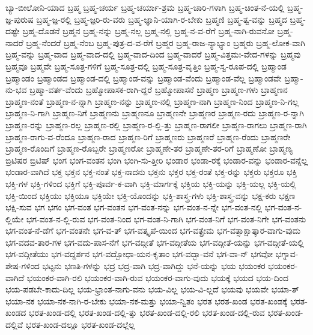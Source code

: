 {ಬ್ಯಾ-ಬೀಲೋನಿ-ಯಾದ
ಬ್ರಹ್ಮ
ಬ್ರಹ್ಮ-ಚರ್ಯ
ಬ್ರಹ್ಮ-ಚರ್ಯಾ-ಶ್ರಮ
ಬ್ರಹ್ಮ-ಚಾರಿ-ಗಳಾಗಿ
ಬ್ರಹ್ಮ-ಚಿಂತ-ನೆ-ಯಲ್ಲಿ
ಬ್ರಹ್ಮ-ಜ್ಞ-ಪುರುಷ
ಬ್ರಹ್ಮ-ಜ್ಞ-ರಲ್ಲಿ
ಬ್ರಹ್ಮ-ಜ್ಞರಿ-ರು-ವರು
ಬ್ರಹ್ಮ-ಜ್ಞಾನಿ-ಯಾಗಿ-ರ-ಬೇಕು
ಬ್ರಹ್ಮಣಿ
ಬ್ರಹ್ಮ-ತ್ವ-ವನ್ನು
ಬ್ರಹ್ಮದ
ಬ್ರಹ್ಮ-ದಷ್ಟೇ
ಬ್ರಹ್ಮ-ದೊಡನೆ
ಬ್ರಹ್ಮನ
ಬ್ರಹ್ಮ-ನನ್ನು
ಬ್ರಹ್ಮ-ನಲ್ಲ
ಬ್ರಹ್ಮ-ನಲ್ಲಿ
ಬ್ರಹ್ಮ-ನ-ವ-ರೆಗೆ
ಬ್ರಹ್ಮ-ನಾಗಿ-ರುವನೋ
ಬ್ರಹ್ಮ-ನಾದರೆ
ಬ್ರಹ್ಮ-ನೆಂದರೆ
ಬ್ರಹ್ಮ-ನೆಂಬ
ಬ್ರಹ್ಮ-ಪುತ್ರ-ದ-ವ-ರೆಗೆ
ಬ್ರಹ್ಮರ
ಬ್ರಹ್ಮ-ರಾಜ-ನ್ಯಾಭ್ಯಾಂ
ಬ್ರಹ್ಮರು
ಬ್ರಹ್ಮ-ಲೋಕ-ವಾಗಿ
ಬ್ರಹ್ಮ-ವನ್ನು
ಬ್ರಹ್ಮ-ವಾದ
ಬ್ರಹ್ಮ-ವಾದ-ದಲ್ಲಿ
ಬ್ರಹ್ಮ-ವಾದ-ದಿಂದ
ಬ್ರಹ್ಮ-ವಾದರೆ
ಬ್ರಹ್ಮ-ವಿತ್ತಮಃ-ವೇದ-ಗಳನ್ನು
ಬ್ರಹ್ಮವು
ಬ್ರಹ್ಮವೂ
ಬ್ರಹ್ಮವೇ
ಬ್ರಹ್ಮ-ಸೂತ್ರ-ಗಳಿಗೆ
ಬ್ರಹ್ಮ-ಸೂತ್ರ-ದಲ್ಲಿ
ಬ್ರಹ್ಮ-ಸೂತ್ರ-ವೃತ್ತಿಂ
ಬ್ರಹ್ಮ-ಸ್ವ-ರೂಪ-ದಲ್ಲಿ
ಬ್ರಹ್ಮಾಂಡ
ಬ್ರಹ್ಮಾಂಡಂ
ಬ್ರಹ್ಮಾಂಡದ
ಬ್ರಹ್ಮಾಂಡ-ದಲ್ಲಿ
ಬ್ರಹ್ಮಾಂಡ-ವನ್ನು
ಬ್ರಹ್ಮಾಂಡ-ವೆಂದು
ಬ್ರಹ್ಮಾಂಡ-ವೆಲ್ಲ
ಬ್ರಹ್ಮಾಂಡವೇ
ಬ್ರಹ್ಮಾ-ನು-ಭವ
ಬ್ರಹ್ಮಾ-ವರ್ತ-ವೆಂದು
ಬ್ರಹ್ಮೋಪಾಸಕ-ರಾಗಿ-ದ್ದರೆ
ಬ್ರಹ್ಮೋಪಾಸನೆ
ಬ್ರಾಹ್ಮಣ
ಬ್ರಾಹ್ಮಣ-ಗಳು
ಬ್ರಾಹ್ಮಣನ
ಬ್ರಾಹ್ಮಣ-ನಂತೆ
ಬ್ರಾಹ್ಮಣ-ನ-ನ್ನಾಗಿ
ಬ್ರಾಹ್ಮಣ-ನನ್ನು
ಬ್ರಾಹ್ಮಣ-ನಲ್ಲಿ
ಬ್ರಾಹ್ಮಣ-ನಾಗಿ
ಬ್ರಾಹ್ಮಣ-ನಿಂದ
ಬ್ರಾಹ್ಮಣ-ನಿ-ಗಲ್ಲ
ಬ್ರಾಹ್ಮಣ-ನಿ-ಗಾಗಿ
ಬ್ರಾಹ್ಮಣ-ನಿಗೆ
ಬ್ರಾಹ್ಮಣನು
ಬ್ರಾಹ್ಮಣನೂ
ಬ್ರಾಹ್ಮಣನೇ
ಬ್ರಾಹ್ಮಣರ
ಬ್ರಾಹ್ಮಣ-ರದು
ಬ್ರಾಹ್ಮಣ-ರ-ನ್ನಾಗಿ
ಬ್ರಾಹ್ಮಣ-ರನ್ನು
ಬ್ರಾಹ್ಮಣ-ರಲ್ಲ
ಬ್ರಾಹ್ಮಣ-ರಲ್ಲಿ
ಬ್ರಾಹ್ಮಣ-ರ-ಲ್ಲಿ-ತ್ತು
ಬ್ರಾಹ್ಮಣ-ರಾಗಲೀ
ಬ್ರಾಹ್ಮಣ-ರಾಗಲು
ಬ್ರಾಹ್ಮಣ-ರಾಗಿ
ಬ್ರಾಹ್ಮಣ-ರಾಗು-ವ-ರೆಂದೂ
ಬ್ರಾಹ್ಮಣ-ರಾದ
ಬ್ರಾಹ್ಮಣ-ರಿಗೆ
ಬ್ರಾಹ್ಮಣರು
ಬ್ರಾಹ್ಮಣರೆ
ಬ್ರಾಹ್ಮಣ-ರೆಂದು
ಬ್ರಾಹ್ಮಣರೇ
ಬ್ರಾಹ್ಮಣ-ರೊಂದಿಗೆ
ಬ್ರಾಹ್ಮಣ-ರೊಬ್ಬರೇ
ಬ್ರಾಹ್ಮಣರೋ
ಬ್ರಾಹ್ಮಣೇ-ತರ
ಬ್ರಾಹ್ಮಣೇ-ತರ-ರಿಗೆ
ಬ್ರಾಹ್ಮಣೋ
ಬ್ರಾಹ್ಮಣ್ಯ
ಬ್ರಿಟಿಷರ
ಬ್ರಿಟಿಷ್
ಭಂಗ
ಭಂಗ-ವಂತನ
ಭಂಗಿ
ಭಂಗಿ-ಸು-ತ್ತೀರಿ
ಭಂಡಾರ
ಭಂಡಾ-ರಕ್ಕೆ
ಭಂಡಾರ-ವನ್ನು
ಭಂಡಾರ-ವನ್ನೆಲ್ಲ
ಭಂಡಾರ-ವಾಗಿದೆ
ಭಕ್ತ
ಭಕ್ತನ
ಭಕ್ತ-ನಂತೆ
ಭಕ್ತ-ನಾದನು
ಭಕ್ತನು
ಭಕ್ತರ
ಭಕ್ತ-ರಂತೆ
ಭಕ್ತ-ರನ್ನು
ಭಕ್ತರು
ಭಕ್ತರೂ
ಭಕ್ತಿ
ಭಕ್ತಿ-ಗಳ
ಭಕ್ತಿ-ಗಳಿಂದ
ಭಕ್ತಿಗೆ
ಭಕ್ತಿ-ಪೂರ್ವ-ಕ-ವಾಗಿ
ಭಕ್ತಿ-ಮಾರ್ಗಕ್ಕೆ
ಭಕ್ತಿಯ
ಭಕ್ತಿ-ಯನ್ನು
ಭಕ್ತಿ-ಯಲ್ಲ
ಭಕ್ತಿ-ಯಲ್ಲಿ
ಭಕ್ತಿ-ಯಿಂದ
ಭಕ್ತಿಯು
ಭಕ್ತಿಯೂ
ಭಕ್ತಿಯೇ
ಭಕ್ತಿ-ಯೊಂದನ್ನು
ಭಕ್ತಿ-ಶಾಸ್ತ್ರ-ಗಳು
ಭಕ್ತಿ-ಶಾಸ್ತ್ರ-ವನ್ನು
ಭಕ್ಷ-ಕರು
ಭಕ್ಷಣ
ಭಕ್ಷಿ-ಸುವ
ಭಗ
ಭಗಂ
ಭಗ-ವಂತ
ಭಗ-ವಂತನ
ಭಗ-ವಂತ-ನನ್ನು
ಭಗ-ವಂತ-ನ-ನ್ನೇ
ಭಗ-ವಂತ-ನಲ್ಲಿ
ಭಗ-ವಂತ-ನ-ಲ್ಲಿಯೇ
ಭಗ-ವಂತ-ನ-ಲ್ಲಿ-ರುವ
ಭಗ-ವಂತ-ನಿಂದ
ಭಗ-ವಂತ-ನಿ-ಗಾಗಿ
ಭಗ-ವಂತ-ನಿಗೆ
ಭಗ-ವಂತ-ನಿಗೇ
ಭಗ-ವಂತನು
ಭಗ-ವಂತ-ನೆ-ಡೆಗೆ
ಭಗ-ವಂತನೇ
ಭಗ-ವ-ತ್
ಭಗ-ವತ್ಕೃಪೆ-ಯಿಂದ
ಭಗ-ವತ್ಪ್ರೇಮ
ಭಗ-ವತ್ಸಾಕ್ಷಾತ್ಕಾರ-ವಾಗು-ವುದು
ಭಗ-ವದವ-ತಾರ-ಗಳ
ಭಗ-ವದು-ಪಾಸ-ನೆಗೆ
ಭಗ-ವದ್ಗೀತೆ
ಭಗ-ವದ್ಗೀತೆಯ
ಭಗ-ವದ್ಗೀತೆ-ಯನ್ನು
ಭಗ-ವದ್ಗೀತೆ-ಯಲ್ಲಿ
ಭಗ-ವದ್ಗೀತೆಯು
ಭಗ-ವದ್ದರ್ಶನ
ಭಗ-ವದ್ಬೋಧಾ-ಯನ-ಕೃತಾಂ
ಭಗ-ವದ್ಭಾ-ವನೆ
ಭಗ-ವಾ-ನ್
ಭಗವೋ
ಭಗ್ನಾವ-ಶೇಷ-ಗಳಿಂದ
ಭಟ್ಟನು
ಭಣತಿ-ಗಳನ್ನು
ಭದ್ರ
ಭದ್ರ-ವಾಗಿ
ಭದ್ರ-ವಾಗಿದ್ದು
ಭನೆ-ಯನ್ನು
ಭಯ
ಭಯಂಕರ
ಭಯಂಕರ-ವಾಗಿದೆ
ಭಯಂಕರ-ವಾಗಿ-ರಲಿ
ಭಯಂಕರ-ವಾಗಿ-ರುವ
ಭಯಂಕರ-ವಾಗು-ವುದು
ಭಯಕ್ಕೆ
ಭಯದ
ಭಯ-ದಿಂದ
ಭಯ-ಪಡಬೇ-ಕಾದು-ದಿಲ್ಲ
ಭಯ-ಭ್ರಾಂತ-ನಾಗು-ವನು
ಭಯ-ವಿಲ್ಲ
ಭಯ-ವಿ-ಲ್ಲದೆ
ಭಯವು
ಭಯವೇ
ಭಯಾ-ತ್
ಭಯಾ-ನಕ
ಭಯಾ-ನಕ-ನಾಗಿ-ರ-ಬೇಕು
ಭಯಾ-ನಕ-ಮತ್ತು
ಭಯಾ-ನ್ವಿತಂ
ಭರತ
ಭರತ-ಖಂಡ
ಭರತ-ಖಂಡಕ್ಕೆ
ಭರತ-ಖಂಡದ
ಭರತ-ಖಂಡ-ದಲ್ಲಿ
ಭರತ-ಖಂಡ-ದಲ್ಲಿ-ತ್ತು
ಭರತ-ಖಂಡ-ದಲ್ಲಿ-ರಲಿ
ಭರತ-ಖಂಡ-ದಲ್ಲಿ-ರುವ
ಭರತ-ಖಂಡ-ದಲ್ಲಿವೆ
ಭರತ-ಖಂಡ-ದಲ್ಲೂ
ಭರತ-ಖಂಡ-ದಲ್ಲೆಲ್ಲ
}

